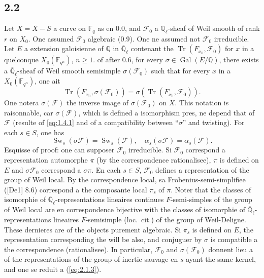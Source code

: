 \documentclass[11pt,a4paper]{article}
\theoremstyle{plain}
\theoremstyle{definition}
\DeclareMathOperator{\Gal}{Gal}
\DeclareMathOperator{\Sw}{Sw}
\DeclareMathOperator{\tr}{Tr}
\begin{document}
\subsection{2.2}

Let $X = \bar{X} - S$ a curve on $\mathbb{F}_q$ as en 0.0, and $\mathcal{F}_0$ a $\overline{\mathbb{Q}}_\ell$-sheaf of Weil smooth of rank $r$ on $X_0$. One assumed $\mathcal{F}_0$ algebraic (0.9). One ne assumed not $\mathcal{F}_0$ irreducible. Let $E$ a extension galoisienne of $\mathbb{Q}$ in $\overline{\mathbb{Q}}_\ell$ contenant the $\tr(F_{x_0}, \mathcal{F}_0)$ for $x$ in a quelconque $X_0(\mathbb{F}_{q^n})$, $n \geq 1$. of after 0.6, for every $\sigma \in \Gal(E/\mathbb{Q})$, there exists a $\overline{\mathbb{Q}}_\ell$-sheaf of Weil smooth semisimple $\sigma(\mathcal{F}_0)$ such that for every $x$ in a $X_0(\mathbb{F}_{q^n})$, one ait
\[
\tr(F_{x_0}, \sigma(\mathcal{F}_0)) = \sigma(\tr(F_{x_0}, \mathcal{F}_0)).
\]
One notera $\sigma(\mathcal{F})$ the inverse image of $\sigma(\mathcal{F}_0)$ on $X$. This notation is raisonnable, car $\sigma(\mathcal{F})$, which is defined a isomorphism pres, ne depend that of $\mathcal{F}$ (resulte of \ref{eq:1.4.1} and of a compatibility between ``$\sigma$'' and twisting). For each $s \in S$, one has
\begin{equation}\label{eq:2.2.1}
\Sw_s(\sigma \mathcal{F}) = \Sw_s(\mathcal{F}), \quad \alpha_s(\sigma \mathcal{F}) = \alpha_s(\mathcal{F}).
\end{equation}
Esquisse of proof: one can supposer $\mathcal{F}_0$ irreducible. Si $\mathcal{F}_0$ correspond a representation automorphe $\pi$ (by the correspondence rationalisee), $\pi$ is defined on $E$ and $\sigma \mathcal{F}_0$ correspond a $\sigma \pi$. En each $s \in S$, $\mathcal{F}_0$ defines a representation of the group of Weil local. By the correspondence local, sa Frobenius-semi-simplifiee ([De1] 8.6) correspond a the composante local $\pi_s$ of $\pi$. Noter that the classes of isomorphie of $\overline{\mathbb{Q}}_\ell$-representations lineaires continues $F$-semi-simples of the group of Weil local are en correspondence bijective with the classes of isomorphie of $\overline{\mathbb{Q}}_\ell$-representations lineaires $F$-semisimple (loc.~cit.) of the group of Weil-Deligne. These dernieres are of the objects purement algebraic. Si $\pi_s$ is defined on $E$, the representation corresponding the will be also, and conjuguer by $\sigma$ is compatible a the correspondence (rationalisee). In particular, $\mathcal{F}_0$ and $\sigma(\mathcal{F}_0)$ donnent lieu a of the representations of the group of inertie sauvage en $s$ ayant the same kernel, and one se reduit a (\ref{eq:2.1.3}).
\end{document}
